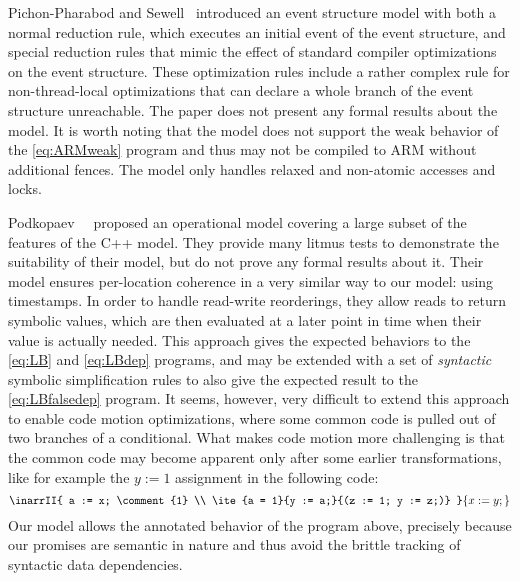 

Pichon-Pharabod and Sewell~\cite{Pichon} introduced an event structure model with both a normal reduction rule, which executes an initial event of the event structure, and special reduction rules that mimic the effect of standard compiler optimizations on the event structure.
These optimization rules include a rather complex rule for non-thread-local optimizations that can declare a whole branch of the event structure unreachable.
The paper does not present any formal results about the model.
It is worth noting that the model does not support the weak behavior of the \ref{eq:ARMweak} program and thus may not be compiled to ARM without additional fences.  The model only handles relaxed and non-atomic accesses and locks.

Podkopaev~\etal~\cite{sergey:2016} proposed an operational model covering a large subset of the features of the C++ model.  They provide many litmus tests to demonstrate the suitability
of their model, but do not prove any formal results about it.
Their model ensures per-location coherence in a very similar way to our model: using timestamps.
In order to handle read-write reorderings, they allow reads to return symbolic values, which are then evaluated at a later point in time when their value is actually needed.
This approach gives the expected behaviors to the \ref{eq:LB} and \ref{eq:LBdep} programs, 
and may be extended with a set of \emph{syntactic} symbolic simplification rules to also give the expected result to the \ref{eq:LBfalsedep} program.
It seems, however, very difficult to extend this approach to enable code motion optimizations, where some common code is pulled out of two branches of a conditional. 
What makes code motion more challenging is that the common code may become apparent only after some earlier transformations, 
like for example the $y:=1$ assignment in the following code:
$$
\inarrII{ a := x; \comment{1} \\ \ite{a = 1}{y := a;}{(z := 1; y := z;)} }{ x := y; } 
$$
Our model allows the annotated behavior of the program above,
precisely because our promises are semantic in nature and thus avoid the brittle
tracking of syntactic data dependencies.


